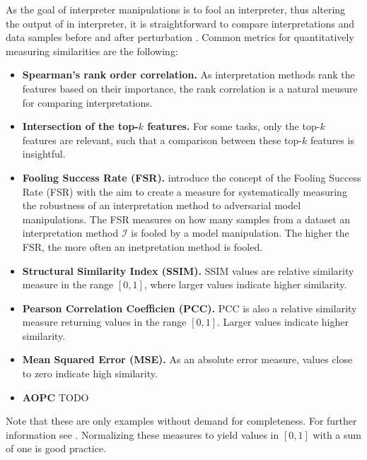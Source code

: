 As the goal of interpreter manipulations is to fool an interpreter, thus altering the output of in interpreter, it is straightforward to compare interpretations and data samples before and after perturbation \cite{ghorbani2019interpretation}.
Common metrics for quantitatively measuring similarities are the following: 
\begin{itemize}
    \item \textbf{Spearman's rank order correlation.} As interpretation methods rank the features based on their importance, the rank correlation \cite{spearman1961proof} is a natural meusure for comparing interpretations. 
    \item \textbf{Intersection of the top-$k$ features.} For some tasks, only the top-$k$ features are relevant, such that a comparison between these top-$k$ features is insightful. 
    \item \textbf{Fooling Success Rate (FSR).} \cite{fooling_nn_interpreters} introduce the concept of the Fooling Success Rate (FSR) with the aim to create a measure for systematically measuring the robustness of an interpretation method to adversarial model manipulations. The FSR measures on how many samples from a dataset an interpretation method $\mathcal{I}$ is fooled by a model manipulation. The higher the FSR, the more often an inetpretation method is fooled. 
    \item \textbf{Structural Similarity Index (SSIM).} SSIM values are relative similarity measure in the range $\left[0, 1\right]$, where larger values indicate higher similarity.
    \item \textbf{Pearson Correlation Coefficien (PCC).} PCC is also a relative similarity measure returning values in the range $\left[0, 1\right]$. Larger values indicate higher similarity.
    \item \textbf{Mean Squared Error (MSE).} As an absolute error measure, values close to zero indicate high similarity. 
    \item \textbf{AOPC} TODO
\end{itemize}
\noindent Note that these are only examples without demand for completeness. For further information see \cite{adebayo2018sanity}.
Normalizing these measures to yield values in $\left[0, 1\right]$ with a sum of one is good practice. 
